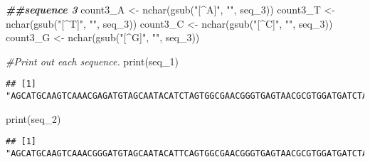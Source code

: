 \documentclass[
]{article}
\newenvironment{Shaded}{\begin{snugshade}}{\end{snugshade}}
\newcommand{\CommentTok}[1]{\textcolor[rgb]{0.56,0.35,0.01}{\textit{#1}}}
\newcommand{\DocumentationTok}[1]{\textcolor[rgb]{0.56,0.35,0.01}{\textbf{\textit{#1}}}}
\newcommand{\FunctionTok}[1]{\textcolor[rgb]{0.00,0.00,0.00}{#1}}
\newcommand{\NormalTok}[1]{#1}
\newcommand{\OtherTok}[1]{\textcolor[rgb]{0.56,0.35,0.01}{#1}}
\newcommand{\StringTok}[1]{\textcolor[rgb]{0.31,0.60,0.02}{#1}}
\begin{document}
\begin{Shaded}
\begin{Highlighting}[]
\DocumentationTok{\#\#sequence 3}
\NormalTok{count3\_A }\OtherTok{\textless{}{-}} \FunctionTok{nchar}\NormalTok{(}\FunctionTok{gsub}\NormalTok{(}\StringTok{"[\^{}A]"}\NormalTok{, }\StringTok{""}\NormalTok{, seq\_3))}
\NormalTok{count3\_T }\OtherTok{\textless{}{-}} \FunctionTok{nchar}\NormalTok{(}\FunctionTok{gsub}\NormalTok{(}\StringTok{"[\^{}T]"}\NormalTok{, }\StringTok{""}\NormalTok{, seq\_3))}
\NormalTok{count3\_C }\OtherTok{\textless{}{-}} \FunctionTok{nchar}\NormalTok{(}\FunctionTok{gsub}\NormalTok{(}\StringTok{"[\^{}C]"}\NormalTok{, }\StringTok{""}\NormalTok{, seq\_3))}
\NormalTok{count3\_G }\OtherTok{\textless{}{-}} \FunctionTok{nchar}\NormalTok{(}\FunctionTok{gsub}\NormalTok{(}\StringTok{"[\^{}G]"}\NormalTok{, }\StringTok{""}\NormalTok{, seq\_3))}
\end{Highlighting}
\end{Shaded}

\begin{Shaded}
\begin{Highlighting}[]
\CommentTok{\#Print out each sequence.}
\FunctionTok{print}\NormalTok{(seq\_1)}
\end{Highlighting}
\end{Shaded}

\begin{verbatim}
## [1] "AGCATGCAAGTCAAACGAGATGTAGCAATACATCTAGTGGCGAACGGGTGAGTAACGCGTGGATGATCTACCTATGAGATGGGGATAACTATTAGAAATAGTAGCTAATACCGAATAAGGTCAATTAATTTGTTAATTGATGAAAGGAAGCCTTTAAAGCTTCGCTTGTAGATGAGTCTGCGTCTTATTAGTTAGTTGGTAGGGTAAATGCCTACCAAGGCGATGATAAGTAACCGGCCTGAGAGGGTGAACGGTCACACTGGAACTGAGACACGGTCCAGACTCCTACGGGAGGCAGCAGCTAAGAATCTTCCGCAATGGGCGAAAGCCTGACGGAGCGACACTGCGTGAATGAAGAAGGTCGAAAGATTGTAAAATTCTTTTATAAATGAGGAATAAGCTTTGTAGGAAATGACGAAGTGATGACGTTAATTTATGAATAAGCCCCGGCTAATTACGTGCCAGCAGCCGCGGTAATACG"
\end{verbatim}

\begin{Shaded}
\begin{Highlighting}[]
\FunctionTok{print}\NormalTok{(seq\_2)}
\end{Highlighting}
\end{Shaded}

\begin{verbatim}
## [1] "AGCATGCAAGTCAAACGGGATGTAGCAATACATTCAGTGGCGAACGGGTGAGTAACGCGTGGATGATCTACCTATGAGATGGGGATAACTATTAGAAATAGTAGCTAATACCGAATAAGGTCAGTTAATTTGTTAATTGATGAAAGGAAGCCTTTAAAGCTTCGCTTGTAGATGAGTCTGCGTCTTATTAGCTAGTTGGTAGGGTAAATGCCTACCAAGGCAATGATAAGTAACCGGCCTGAGAGGGTGAACGGTCACACTGGAACTGAGATACGGTCCAGACTCCTACGGGAGGCAGCAGCTAAGAATCTTCCGCAATGGGCGAAAGCCTGACGGAGCGACACTGCGTGAATGAAGAAGGTCGAAAGATTGTAAAATTCTTTTATAAATGAGGAATAAGCTTTGTAGGAAATGACAAAGTGATGACGTTAATTTATGAATAAGCCCCGGCTAATTACGTGCCAGCAGCAGCGGTAATACG"
\end{verbatim}
\end{document}
